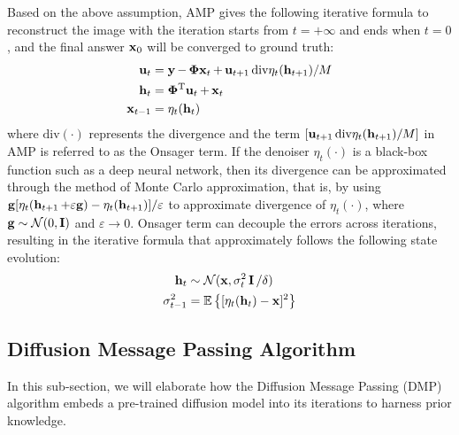 \documentclass[10pt,twocolumn,letterpaper]{article}
\begin{document}
Based on the above assumption, AMP gives the following iterative formula to reconstruct the image with the iteration starts from $t = +\infty$ and ends when $t = 0$, and the final answer $\operatorname{\mathbf{x}}_0$ will be converged to ground truth:
\begin{equation} \label{eq:amp}
	\begin{aligned}
		\operatorname{\mathbf{u}}_t &= \operatorname{\mathbf{y}} - \operatorname{\mathbf{\Phi x}}_t + \operatorname{\mathbf{u}}_{t+1} \text{div}\eta_t(\operatorname{\mathbf{h}}_{t+1})  / M \\
		\operatorname{\mathbf{h}}_t &= \operatorname{\mathbf{\Phi}^T \mathbf{u}}_t + \operatorname{\mathbf{x}}_t \\
		\operatorname{\mathbf{x}}_{t-1} &= \eta_t(\operatorname{\mathbf{h}}_t)
	\end{aligned}
\end{equation}
where $\text{div}(\cdot)$ represents the divergence and the term $[\operatorname{\mathbf{u}}_{t+1} \text{div}\eta_t(\operatorname{\mathbf{h}}_{t+1})/M]$ in AMP is referred to as the Onsager term. If the denoiser $\eta_t (\cdot)$ is a black-box function such as a deep neural network, then its divergence can be approximated through the method of Monte Carlo approximation\cite{DBLP:journals/tip/RamaniBU08, DBLP:journals/tit/MetzlerMB16}, that is, by using $\mathbf{g}[\eta_t(\operatorname{\mathbf{h}}_{t+1}+\varepsilon \mathbf{g}) - \eta_t(\operatorname{\mathbf{h}}_{t+1})]/\varepsilon$ to approximate divergence of $\eta_t (\cdot)$, where $\mathbf{g} \sim \mathcal{N} (0, \operatorname{\mathbf{I}})$ and $\varepsilon \to 0$. Onsager term can decouple the errors across iterations, resulting in the iterative formula that approximately follows the following state evolution:
\begin{equation}
	\begin{aligned}
		\operatorname{\mathbf{h}}_t &\sim \mathcal{N} (\operatorname{\mathbf{x}}, \sigma^2_t \operatorname{\mathbf{I}} / \delta) \\
		\sigma^2_{t-1} &= \mathbb{E}\left\{ [\eta_t(\operatorname{\mathbf{h}}_t) - \operatorname{\mathbf{x}}]^2 \right\}
	\end{aligned}
\end{equation}

\subsection{Diffusion Message Passing Algorithm}
In this sub-section, we will elaborate how the Diffusion Message Passing (DMP) algorithm embeds a pre-trained diffusion model into its iterations to harness prior knowledge.
\end{document}
